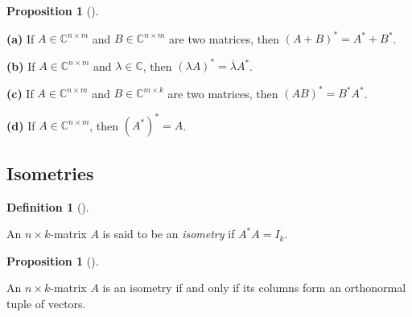 \documentclass[numbers=enddot,12pt,final,onecolumn,notitlepage]{scrartcl}%
\numberwithin{exer}{subsection}
\theoremstyle{definition}
\newtheorem{prop}[theo]{Proposition}
\newenvironment{proposition}[1][]
{\begin{prop}[#1]\begin{leftbar}}
{\end{leftbar}\end{prop}}
\newtheorem{defi}[theo]{Definition}
\newenvironment{definition}[1][]
{\begin{defi}[#1]\begin{leftbar}}
{\end{leftbar}\end{defi}}
\begin{document}
\begin{proposition}
\label{prop.unitary.(AB)*}\textbf{(a)} If $A\in\mathbb{C}^{n\times m}$ and
$B\in\mathbb{C}^{n\times m}$ are two matrices, then $\left(  A+B\right)
^{\ast}=A^{\ast}+B^{\ast}$. \medskip

\textbf{(b)} If $A\in\mathbb{C}^{n\times m}$ and $\lambda\in\mathbb{C}$, then
$\left(  \lambda A\right)  ^{\ast}=\overline{\lambda}A^{\ast}$. \medskip

\textbf{(c)} If $A\in\mathbb{C}^{n\times m}$ and $B\in\mathbb{C}^{m\times k}$
are two matrices, then $\left(  AB\right)  ^{\ast}=B^{\ast}A^{\ast}$. \medskip

\textbf{(d)} If $A\in\mathbb{C}^{n\times m}$, then $\left(  A^{\ast}\right)
^{\ast}=A$.
\end{proposition}

\subsection{Isometries}

\begin{definition}
\label{def.unitary.innerprod.isometry}An $n\times k$-matrix $A$ is said to be
an \emph{isometry} if $A^{\ast}A=I_{k}$.
\end{definition}

\begin{proposition}
\label{prop.unitary.innerprod.isometry.2}An $n\times k$-matrix $A$ is an
isometry if and only if its columns form an orthonormal tuple of vectors.
\end{proposition}
\end{document}
